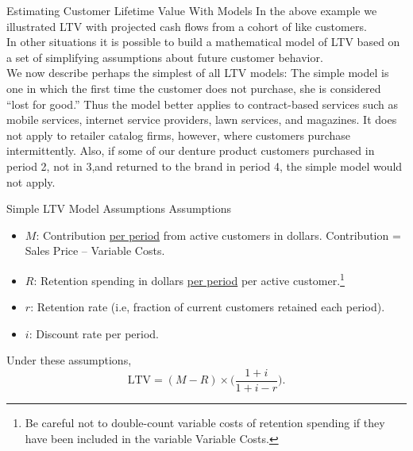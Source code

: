 \documentclass[pdf]{beamer}
\theoremstyle{remark}
\theoremstyle{definition}
\begin{document}
\begin{frame}[t]{Estimating Customer Lifetime Value With Models}
In the above example we illustrated LTV with projected cash flows from a cohort of like customers. \\
\vspace{1.5ex}
In other situations it is possible to build a mathematical model of LTV based on a set of simplifying assumptions about future customer behavior. \\
\vspace{1.5ex}
We now describe perhaps the simplest of all LTV models: The simple model is one in which the first time the customer does not purchase, she is considered ``lost for good.'' Thus the model better applies to contract-based services such as mobile services, internet service providers, lawn services, and magazines. It does not apply to retailer catalog firms, however, where customers purchase intermittently. Also, if some of our denture product customers purchased in period 2, not in 3,and returned to the brand in period 4, the simple model would not apply.
\end{frame}

\begin{frame}[t]{Simple LTV Model Assumptions}
Assumptions \\
\vspace{1.5ex}
\begin{itemize}
\item $M$:  Contribution \underline{per period} from active customers in dollars. Contribution = Sales Price – Variable Costs.
\item $R$:  Retention spending in dollars \underline{per period} per active customer.\footnote{Be careful not to double-count variable costs of retention spending if they have been included in the variable Variable Costs.}
\item $r$:  Retention rate (i.e, fraction of current customers retained each period).
\item $i$:  Discount rate per period.
\end{itemize}
Under these assumptions, 
\begin{equation} \label{eqn:eqn1}
\text{LTV} = (M - R) \times \bigg( \frac{1+i}{1+i-r} \bigg).
\end{equation}

\end{frame}
\end{document}
